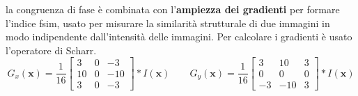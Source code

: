\documentclass[../main.tex]{subfiles}
\begin{document}
la congruenza di fase è combinata con l'\textbf{ampiezza dei gradienti} per formare l'indice \acrshort{fsim}, usato per misurare la similarità strutturale di due immagini in modo indipendente dall'intensità delle immagini.\cite{zhang_2011} Per calcolare i gradienti è usato l'operatore di Scharr.\cite{jahne_1999}
\begin{equation}
	G_x(\mathbf{x}) = \frac{1}{16}\begin{bmatrix}
		3 & 0 & -3 \\
		10 & 0 & -10 \\
		3 & 0 & -3
	\end{bmatrix} * I(\mathbf{x}) \qquad
	G_y(\mathbf{x}) = \frac{1}{16}\begin{bmatrix}
		3 & 10 & 3 \\
		0 & 0 & 0 \\
		-3 & -10 & 3 
	\end{bmatrix} * I(\mathbf{x})
\end{equation}
\end{document}
